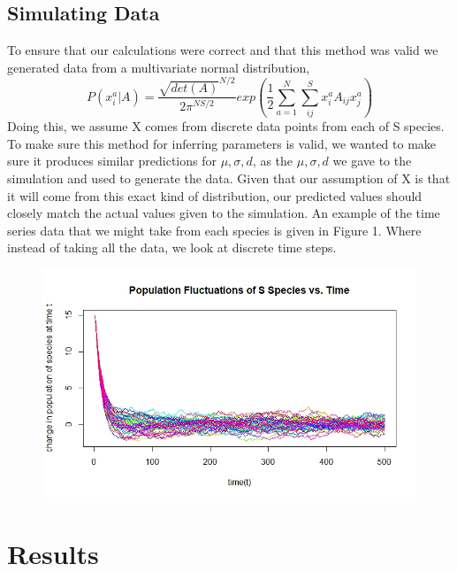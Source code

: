 \documentclass{article}
\begin{document}
\subsection{Simulating Data}\hfill\break
To ensure that our calculations were correct and that this method was valid we generated data from a multivariate normal distribution, 
$$P(x_i^a| A)=\dfrac{\sqrt{det(A)}^{N/2}}{2\pi^{NS/2}} exp(\dfrac{1}{2}\sum_{a=1}^N\sum_{ij}^S x_i^aA_{ij}x_j^a)$$ \hfill\break
Doing this, we assume X comes from discrete data points from each of S species. To make sure this method for inferring parameters is valid, we wanted to make sure it produces similar predictions for $\mu,\sigma,d$, as the $\mu,\sigma,d$ we gave to the simulation and used to generate the data. Given that our assumption of X is that it will come from this exact kind of distribution, our predicted values should closely match the actual values given to the simulation. An example of the time series data that we might take from each species is given in Figure 1. Where instead of taking all the data, we look at discrete time steps.
\hfill\break
\hfill\break
\hfill\break
\hfill\break
\hfill\break
\hfill\break
\hfill\break
\hfill\break
\hfill\break
\hfill\break
\begin{figure}
\includegraphics[scale=0.6]{Popf}
\end{figure}
\hfill\break
\hfill\break
\hfill\break
\hfill\break
\hfill\break
\hfill\break
\hfill\break
\section{Results}
\end{document}
